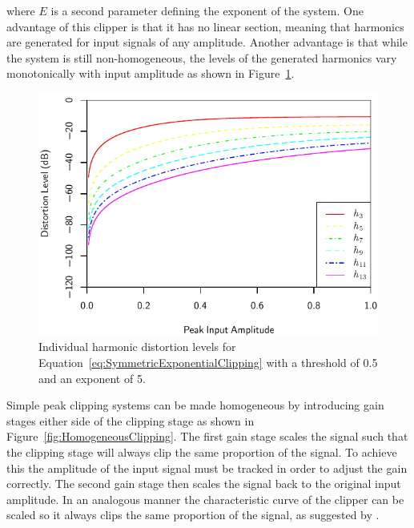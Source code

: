			where $E$ is a second parameter defining the exponent of the system. One advantage of this clipper
			is that it has no linear section, meaning that harmonics are generated for input signals of any
			amplitude. Another advantage is that while the system is still non-homogeneous, the levels of the
			generated harmonics vary monotonically with input amplitude as shown in
			Figure~\ref{fig:ExponentialClippingHarmonics}.

			\begin{figure}[h!]
				\centering
				\includegraphics{chapter5/Images/ExponentialClippingHarmonics.pdf}
				\caption{Individual harmonic distortion levels for
					 Equation~\ref{eq:SymmetricExponentialClipping} with a threshold of 0.5 and an 
				         exponent of 5.}
				\label{fig:ExponentialClippingHarmonics}
			\end{figure}

			Simple peak clipping systems can be made homogeneous by introducing gain stages either side of the
			clipping stage as shown in Figure~\ref{fig:HomogeneousClipping}. The first gain stage scales the
			signal such that the clipping stage will always clip the same proportion of the signal. To achieve
			this the amplitude of the input signal must be tracked in order to adjust the gain correctly. The
			second gain stage then scales the signal back to the original input amplitude. In an analogous
			manner the characteristic curve of the clipper can be scaled so it always clips the same proportion
			of the signal, as suggested by \citet{deman2014adaptive}.

